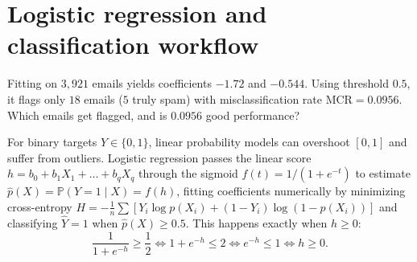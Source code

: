 \documentclass[10pt]{scrartcl}
\begin{document}
\section{Logistic regression and classification workflow}

\begin{qbox}
  Fitting  on $3{,}921$ emails yields coefficients $-1.72$ and $-0.544$. Using threshold $0.5$, it flags only $18$ emails ($5$ truly spam) with misclassification rate $\mathrm{MCR} = 0.0956$. Which emails get flagged, and is $0.0956$ good performance?
\end{qbox}

For binary targets $Y \in \{0,1\}$, linear probability models can overshoot $[0,1]$ and suffer from outliers. Logistic regression passes the linear score $h = b_0 + b_1 X_1 + \dots + b_q X_q$ through the sigmoid $f(t) = 1/(1 + e^{-t})$ to estimate $\hat p(X) = \mathbb P(Y = 1 \mid X) = f(h)$, fitting coefficients numerically by minimizing cross-entropy $H = -\frac{1}{n}\sum [Y_i \log p(X_i) + (1-Y_i)\log(1-p(X_i))]$ and classifying $\hat Y = 1$ when $\hat p(X) \ge 0.5$. This happens exactly when $h \ge 0$:
\[
  \frac{1}{1+e^{-h}} \ge \frac12 \iff 1 + e^{-h} \le 2 \iff e^{-h} \le 1 \iff h \ge 0 .
\]
\end{document}
